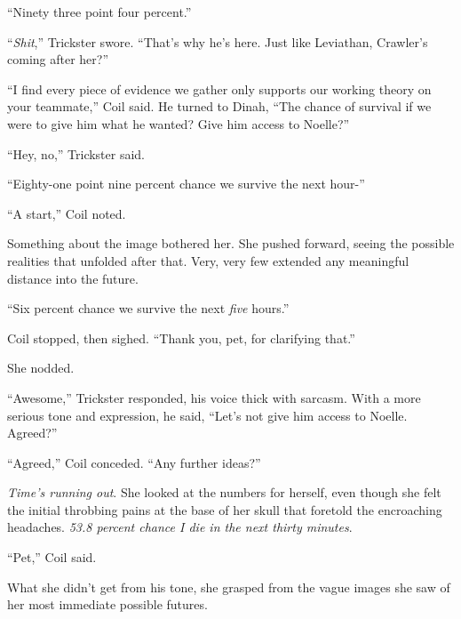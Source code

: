 ``Ninety three point four percent.''



``\emph{Shit},'' Trickster swore.  ``That's why he's here.  Just like Leviathan, Crawler's coming after her?''



``I find every piece of evidence we gather only supports our working theory on your teammate,'' Coil said.  He turned to Dinah, ``The chance of survival if we were to give him what he wanted?  Give him access to Noelle?''



``Hey, no,'' Trickster said.



``Eighty-one point nine percent chance we survive the next hour-''



``A start,'' Coil noted.



Something about the image bothered her.  She pushed forward, seeing the possible realities that unfolded after that.  Very, very few extended any meaningful distance into the future.



``Six percent chance we survive the next \emph{five} hours.''



Coil stopped, then sighed.  ``Thank you, pet, for clarifying that.''



She nodded.



``Awesome,'' Trickster responded, his voice thick with sarcasm.  With a more serious tone and expression, he said, ``Let's not give him access to Noelle.  Agreed?''



``Agreed,'' Coil conceded.  ``Any further ideas?''



\emph{Time's running out}.  She looked at the numbers for herself, even though she felt the initial throbbing pains at the base of her skull that foretold the encroaching headaches.  \emph{53.8 percent chance I die in the next thirty minutes}.



``Pet,'' Coil said.



What she didn't get from his tone, she grasped from the vague images she saw of her most immediate possible futures.



